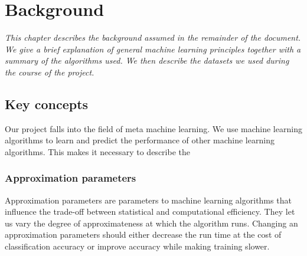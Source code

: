 \documentclass[a4paper,12pt,twoside,openright]{report}
\begin{document}
\chapter{Background}
\textit{This chapter describes the background assumed in the remainder of the document. We give a brief explanation of general machine learning principles together with a summary of the algorithms used. We then describe the datasets we used during the course of the project.}






\section{Key concepts}
Our project falls into the field of meta machine learning. We use machine learning algorithms to learn and predict the performance of other machine learning algorithms. This makes it necessary to describe the 


\subsection{Approximation parameters}
Approximation parameters are parameters to machine learning algorithms that influence the trade-off between statistical and computational efficiency. They let us vary the degree of approximateness at which the algorithm runs. Changing an approximation parameters should either decrease the run time at the cost of classification accuracy or improve accuracy while making training slower. 
\end{document}
